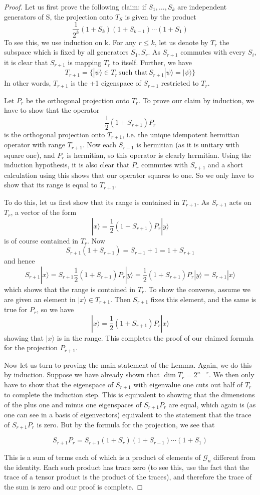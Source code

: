 \documentclass[a4paper, draft]{article}
\theoremstyle{own}
\theoremstyle{remark}
\begin{document}
\begin{proof}
Let us first prove the following claim: if $S_1, \dots, S_k$ are independent generators of S, the projection onto $T_S$ is given by the product
$$
\frac{1}{2^k}(1+S_k)(1+S_{k-1}) \cdots (1+S_1)
$$
To see this, we use induction on k. For any $r \leq k$, let us denote by $T_r$ the subspace which is fixed by all generators $S_1, S_r$. As $S_{r+1}$ commutes with every $S_i$, it is clear that $S_{r+1}$ is mapping $T_r$ to itself. Further, we have
$$
T_{r+1} = \{ |\psi\rangle \in T_r \, \text{such that} \,  S_{r+1} |\psi \rangle = |\psi \rangle \}
$$
In other words, $T_{r+1}$ is the +1 eigenspace of $S_{r+1}$ restricted to $T_r$. 

Let $P_r$ be the orthogonal projection onto $T_r$. To prove our claim by induction, we have to show that the operator
$$
\frac{1}{2} (1 + S_{r+1}) P_r
$$
is the orthogonal projection onto $T_{r+1}$, i.e. the unique idempotent hermitian operator with range $T_{r+1}$. Now each $S_{r+1}$ is hermitian (as it is unitary with square one), and $P_r$ is hermitian, so this operator is clearly hermitian. Using the induction hypothesis, it is also clear that $P_r$ commutes with $S_{r+1}$ and a short calculation using this shows that our operator squares to one. So we only have to show that its range is equal to $T_{r+1}$.

To do this, let us first show that its range is contained in $T_{r+1}$. As $S_{r+1}$ acts on $T_r$, a vector of the form
$$
|x \rangle = \frac{1}{2}(1 + S_{r+1}) P_r |y \rangle
$$
is of course contained in $T_r$. Now
$$
S_{r+1}(1+S_{r+1}) = S_{r+1} + 1 = 1 + S_{r+1}
$$
and hence
$$
S_{r+1} |x \rangle = S_{r+1} \frac{1}{2}(1 + S_{r+1}) P_r |y \rangle = \frac{1}{2}(1 + S_{r+1}) P_r |y \rangle = S_{r+1} |x \rangle
$$
which shows that the range is contained in $T_r$. To show the converse, assume we are given an element in $|x \rangle \in T_{r+1}$. Then $S_{r+1}$ fixes this element, and the same is true for $P_r$, so we have
$$
|x \rangle = \frac{1}{2} (1 + S_{r+1}) P_r |x \rangle
$$
showing that $|x \rangle$ is in the range. This completes the proof of our claimed formula for the projection $P_{r+1}$. 

Now let us turn to proving the main statement of the Lemma. Again, we do this by induction. Suppose we have already shown that $\dim T_r = 2^{n-r}$. We then only have to show that the eigenspace of $S_{r+1}$ with eigenvalue one cuts out half of $T_r$ to complete the induction step. This is equivalent to showing that the dimensions of the plus one and minus one eigenspaces of $S_{r+1} P_r$ are equal, which again is (as one can see in a basis of eigenvectors) equivalent to the statement that the trace of $S_{r+1} P_r$ is zero. But by the formula for the projection, we see that

$$
S_{r+1} P_r = S_{r+1} (1 + S_r) (1 + S_{r-1}) \cdots (1 + S_1)
$$

This is a sum of terms each of which is a product of elements of $\mathcal{G}_n$ different from the identity. Each such product has trace zero (to see this, use the fact that the trace of a tensor product is the product of the traces), and therefore the trace of the sum is zero and our proof is complete.
\end{proof}
\end{document}
